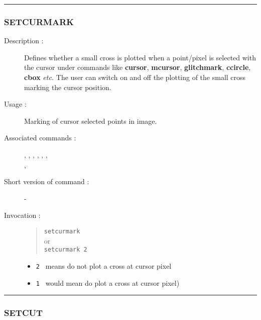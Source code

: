 \hrule 
\subsubsection*{\label{SETCURMARK}SETCURMARK}

\begin{description}

\item[Description :] Defines whether a small cross is plotted when a
point/pixel is selected with the cursor under commands like {\bf cursor},
{\bf mcursor}, {\bf glitchmark}, {\bf ccircle}, {\bf cbox} \emph{etc.}
The user can switch on and off the plotting of the small cross marking
the cursor position.

\item[Usage :] Marking of cursor selected points in image.

\item[Associated commands :] {\tt {}}, 
{\tt {}}, {\tt {}}, 
{\tt {}}, {\tt {}}, 
{\tt {}}, \\ {\tt {}}, 
{\tt {}}

\item[Short version of command :] -
\item[Invocation :]

\begin{quote}{\tt  setcurmark }\\
or \\
{\tt setcurmark 2 }
\end{quote}

\begin{itemize}

\item {\tt 2 } means do not plot a cross at cursor pixel
\item {\tt 1 } would mean do plot a cross at cursor pixel)
\end{itemize}

\end{description}

\hrule 
\subsubsection*{\label{SETCUT}SETCUT}

